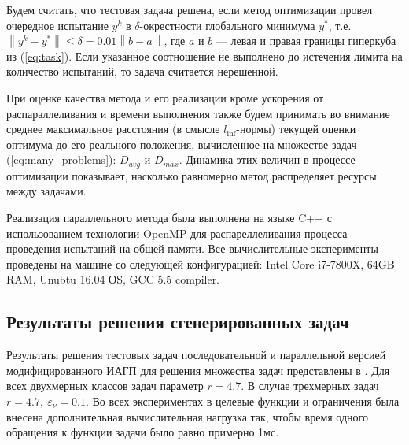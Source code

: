 \documentclass{cmi}
\begin{document}

Будем считать, что тестовая задача решена, если метод оптимизации провел очередное испытание \(y^k\) в
\(\delta\)-окрестности глобального минимума \(y^*\), т.е. $\left\|y^k-
y^*\right\|\leqslant \delta = 0.01\left\|b-a\right\|$, где \(a\) и \(b\) --- левая и правая границы гиперкуба из (\ref{eq:task}).
Если указанное соотношение не выполнено до истечения лимита на количество испытаний, то задача считается нерешенной.

При оценке качества метода и его реализации кроме ускорения от распараллеливания и времени выполнения также будем принимать во внимание среднее максимальное расстояния (в смысле \(l_{\inf}\)-нормы) текущей оценки оптимума до его реального положения,
вычисленное на множестве задач (\ref{eq:many_problems}): \(D_{avg}\) и \(D_{max}\). Динамика этих величин в процессе оптимизации
показывает, насколько равномерно метод распределяет ресурсы между задачами.

Реализация параллельного метода была выполнена на языке C++ с использованием технологии OpenMP
для распареллеливания процесса проведения испытаний на общей памяти. Все вычислительные
эксперименты проведены на машине со следующей конфигурацией: Intel Core i7-7800X, 64GB RAM, Unubtu 16.04 ОS, GCC 5.5 compiler.

\subsection{Результаты решения сгенерированных задач}

Результаты решения тестовых задач последовательной и параллельной версией модифицированного ИАГП
для решения множества задач представлены в . Для всех двухмерных классов задач параметр \(r=4.7\).
В случае трехмерных задач \(r=4.7,\: \varepsilon_\nu=0.1\).
Во всех экспериментах в целевые функции и ограничения была внесена дополнительная вычислительная нагрузка так,
чтобы время одного обращения к функции задачи было равно примерно 1мс.
\end{document}

